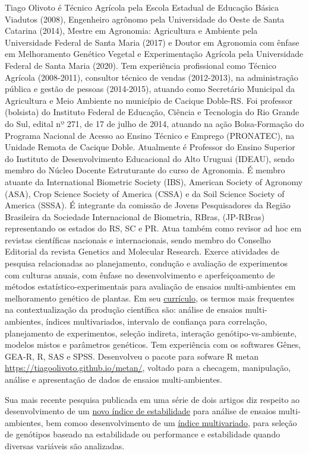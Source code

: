 \documentclass[
]{book}
\numberwithin{equation}{section}
\begin{document}
Tiago Olivoto é Técnico Agrícola pela Escola Estadual de Educação Básica Viadutos (2008), Engenheiro agrônomo pela Universidade do Oeste de Santa Catarina (2014), Mestre em Agronomia: Agricultura e Ambiente pela Universidade Federal de Santa Maria (2017) e Doutor em Agronomia com ênfase em Melhoramento Genético Vegetal e Experimentação Agrícola pela Universidade Federal de Santa Maria (2020). Tem experiência profissional como Técnico Agrícola (2008-2011), consultor técnico de vendas (2012-2013), na administração pública e gestão de pessoas (2014-2015), atuando como Secretário Municipal da Agricultura e Meio Ambiente no município de Cacique Doble-RS. Foi professor (bolsista) do Instituto Federal de Educação, Ciência e Tecnologia do Rio Grande do Sul, edital nº 271, de 17 de julho de 2014, atuando na ação Bolsa-Formação do Programa Nacional de Acesso ao Ensino Técnico e Emprego (PRONATEC), na Unidade Remota de Cacique Doble. Atualmente é Professor do Ensino Superior do Instituto de Desenvolvimento Educacional do Alto Uruguai (IDEAU), sendo membro do Núcleo Docente Estruturante do curso de Agronomia. É membro atuante da International Biometric Society (IBS), American Society of Agronomy (ASA), Crop Science Society of America (CSSA) e da Soil Science Society of America (SSSA). É integrante da comissão de Jovens Pesquisadores da Região Brasileira da Sociedade Internacional de Biometria, RBras, (JP-RBras) representando os estados do RS, SC e PR. Atua também como revisor ad hoc em revistas científicas nacionais e internacionais, sendo membro do Conselho Editorial da revista Genetics and Molecular Research. Exerce atividades de pesquisa relacionadas ao planejamento, condução e avaliação de experimentos com culturas anuais, com ênfase no desenvolvimento e aperfeiçoamento de métodos estatístico-experimentais para avaliação de ensaios multi-ambientes em melhoramento genético de plantas. Em seu \href{http://buscatextual.cnpq.br/buscatextual/visualizacv.do?id=K4416862T6}{currículo}, os termos mais frequentes na contextualização da produção científica são: análise de ensaios multi-ambientes, índices multivariados, intervalo de confiança para correlação, planejamento de experimentos, seleção indireta, interação genótipo-vs-ambiente, modelos mistos e parâmetros genéticos. Tem experiência com os softwares Gênes, GEA-R, R, SAS e SPSS. Desenvolveu o pacote para sofware R metan \url{https://tiagoolivoto.github.io/metan/}, voltado para a checagem, manipulação, análise e apresentação de dados de ensaios multi-ambientes.

Sua mais recente pesquisa publicada em uma série de dois artigos diz respeito ao desenvolvimento de um \href{https://www.researchgate.net/publication/334635697_Mean_performance_and_stability_in_multi-environment_trials_I_Combining_features_of_AMMI_and_BLUP_techniques}{novo índice de estabilidade} para análise de ensaios multi-ambientes, bem comoo desenvolvimento de um \href{https://www.researchgate.net/publication/334636021_Mean_performance_and_stability_in_multi-environment_trials_II_Selection_based_on_multiple_traits}{índice multivariado}, para seleção de genótipos baseado na estabilidade ou performance e estabilidade quando diversas variáveis são analizadas.
\end{document}
